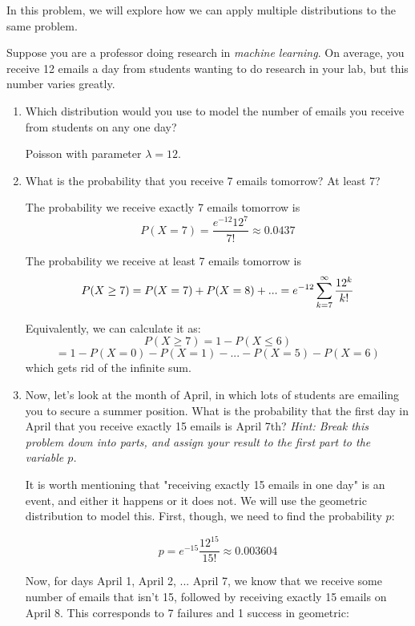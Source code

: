 \question In this problem, we will explore how we can apply multiple distributions to the same problem.

Suppose you are a professor doing research in \textit{machine learning}. On average, you receive 12 emails a day from students wanting to do research in your lab, but this number varies greatly.

\begin{enumerate}[label=(\alph*)]
\item Which distribution would you use to model the number of emails you receive from students on any one day?
\begin{solution}[2cm]
Poisson with parameter $\lambda = 12$. 
\end{solution}

\item What is the probability that you receive 7 emails tomorrow? At least 7?
\begin{solution}[2cm]
The probability we receive exactly 7 emails tomorrow is
$$P(X = 7) = \frac{e^{-12}12^7}{7!} \approx 0.0437$$

The probability we receive at least 7 emails tomorrow is
$$P(X \geq 7) = P(X = 7) + P(X = 8) + ...
\\ = e^{-12} \sum_{k = 7}^\infty \frac{12^k}{k!}$$

Equivalently, we can calculate it as:
$$P(X \geq 7) = 1 - P(X \leq 6)$$
$$= 1 - P(X = 0) - P(X = 1) - ... - P(X = 5) - P(X = 6)$$
which gets rid of the infinite sum.
\end{solution}

\item Now, let's look at the month of April, in which lots of students are emailing you to secure a summer position. What is the probability that the first day in April that you receive exactly 15 emails is April 7th? \textit{Hint: Break this problem down into parts, and assign your result to the first part to the variable $p$.}
\begin{solution}[2cm]
It is worth mentioning that "receiving exactly 15 emails in one day" is an event, and either it happens or it does not. We will use the geometric distribution to model this. First, though, we need to find the probability $p$:

$$p = e^{-15} \frac{12^{15}}{15!} \approx 0.003604$$

Now, for days April 1, April 2, ... April 7, we know that we receive some number of emails that isn't 15, followed by receiving exactly 15 emails on April 8. This corresponds to 7 failures and 1 success in geometric:


\end{solution}
\end{enumerate}
